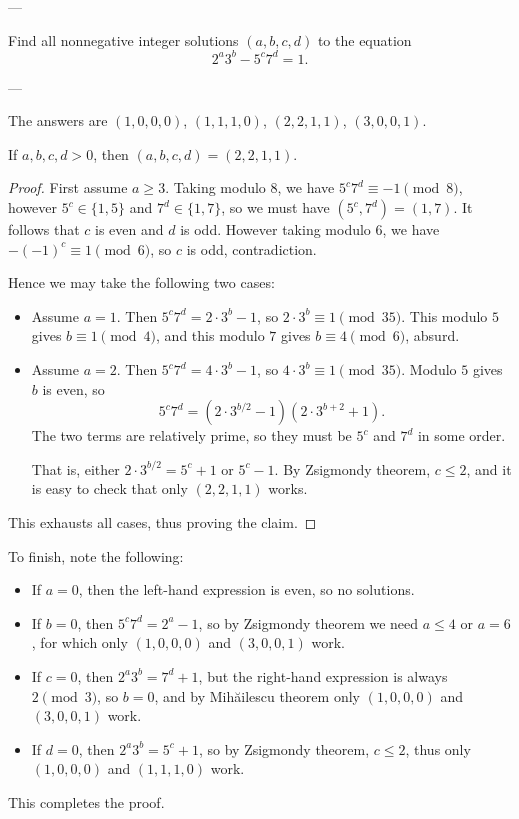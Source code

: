 
---

Find all nonnegative integer solutions $(a,b,c,d)$ to the equation \[2^a3^b-5^c7^d=1.\]

---

The answers are $(1,0,0,0)$, $(1,1,1,0)$, $(2,2,1,1)$, $(3,0,0,1)$.
\begin{iclaim*}
    If $a,b,c,d>0$, then $(a,b,c,d)=(2,2,1,1)$.
\end{iclaim*}
\begin{proof}
    First assume $a\ge3$. Taking modulo $8$, we have $5^c7^d\equiv-1\pmod8$, however $5^c\in\{1,5\}$ and $7^d\in\{1,7\}$, so we must have $(5^c,7^d)=(1,7)$. It follows that $c$ is even and $d$ is odd. However taking modulo $6$, we have $-(-1)^c\equiv1\pmod6$, so $c$ is odd, contradiction.

    Hence we may take the following two cases:
    \begin{itemize}
        \item Assume $a=1$. Then $5^c7^d=2\cdot3^b-1$, so $2\cdot3^b\equiv1\pmod{35}$. This modulo $5$ gives $b\equiv1\pmod4$, and this modulo $7$ gives $b\equiv4\pmod6$, absurd.
        \item Assume $a=2$. Then $5^c7^d=4\cdot3^b-1$, so $4\cdot3^b\equiv1\pmod{35}$. Modulo $5$ gives $b$ is even, so \[5^c7^d=(2\cdot3^{b/2}-1)(2\cdot3^{b+2}+1).\]
            The two terms are relatively prime, so they must be $5^c$ and $7^d$ in some order.

            That is, either $2\cdot3^{b/2}=5^c+1$ or $5^c-1$. By Zsigmondy theorem, $c\le2$, and it is easy to check that only $(2,2,1,1)$ works.
    \end{itemize}
    This exhausts all cases, thus proving the claim.
\end{proof}

To finish, note the following:
\begin{itemize}
    \item If $a=0$, then the left-hand expression is even, so no solutions.
    \item If $b=0$, then $5^c7^d=2^a-1$, so by Zsigmondy theorem we need $a\le4$ or $a=6$, for which only $(1,0,0,0)$ and $(3,0,0,1)$ work.
    \item If $c=0$, then $2^a3^b=7^d+1$, but the right-hand expression is always $2\pmod3$, so $b=0$, and by Mih\u ailescu theorem only $(1,0,0,0)$ and $(3,0,0,1)$ work.
    \item If $d=0$, then $2^a3^b=5^c+1$, so by Zsigmondy theorem, $c\le2$, thus only $(1,0,0,0)$ and $(1,1,1,0)$ work.
\end{itemize}
This completes the proof.

